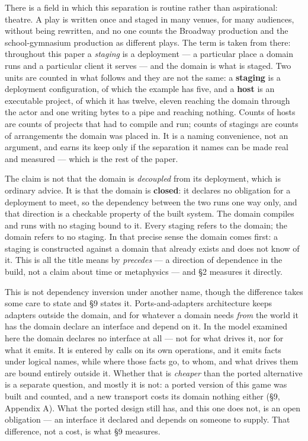 \documentclass[
]{article}
\begin{document}
There is a field in which this separation is routine rather than
aspirational: theatre. A play is written once and staged in many venues,
for many audiences, without being rewritten, and no one counts the
Broadway production and the school-gymnasium production as different
plays. The term is taken from there: throughout this paper a
\emph{staging} is a deployment --- a particular place a domain runs and
a particular client it serves --- and the domain is what is staged. Two
units are counted in what follows and they are not the same: a
\textbf{staging} is a deployment configuration, of which the example has
five, and a \textbf{host} is an executable project, of which it has
twelve, eleven reaching the domain through the actor and one writing
bytes to a pipe and reaching nothing. Counts of hosts are counts of
projects that had to compile and run; counts of stagings are counts of
arrangements the domain was placed in. It is a naming convenience, not
an argument, and earns its keep only if the separation it names can be
made real and measured --- which is the rest of the paper.

The claim is not that the domain is \emph{decoupled} from its
deployment, which is ordinary advice. It is that the domain is
\textbf{closed}: it declares no obligation for a deployment to meet, so
the dependency between the two runs one way only, and that direction is
a checkable property of the built system. The domain compiles and runs
with no staging bound to it. Every staging refers to the domain; the
domain refers to no staging. In that precise sense the domain comes
first: a staging is constructed against a domain that already exists and
does not know of it. This is all the title means by \emph{precedes} ---
a direction of dependence in the build, not a claim about time or
metaphysics --- and §2 measures it directly.

This is not dependency inversion under another name, though the
difference takes some care to state and §9 states it. Ports-and-adapters
architecture keeps adapters outside the domain, and for whatever a
domain needs \emph{from} the world it has the domain declare an
interface and depend on it. In the model examined here the domain
declares no interface at all --- not for what drives it, nor for what it
emits. It is entered by calls on its own operations, and it emits facts
under logical names, while where those facts go, to whom, and what
drives them are bound entirely outside it. Whether that is
\emph{cheaper} than the ported alternative is a separate question, and
mostly it is not: a ported version of this game was built and counted,
and a new transport costs its domain nothing either (§9, Appendix A).
What the ported design still has, and this one does not, is an open
obligation --- an interface it declared and depends on someone to
supply. That difference, not a cost, is what §9 measures.
\end{document}
